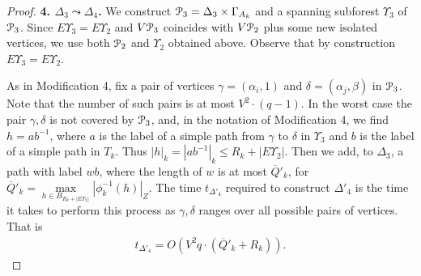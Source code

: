 \documentclass[a4paper,12pt]{article}
\renewcommand{\a}{\alpha }
\renewcommand{\b}{\beta }
\newcommand{\G}{\Gamma }
\newcommand{\g}{\gamma }
\newcommand{\D}{\Delta }
\renewcommand{\d}{\delta }
\newcommand{\U}{\Upsilon }
\newcommand{\cP}{{\cal{P}}}
\numberwithin{equation}{section}
\numberwithin{figure}{section}
\begin{document}
\begin{proof}
{\bf 4. $\D_3 \leadsto \D_4$.}
We construct $\cP_3=\D_3\times
\G_{A_k}$ and a
spanning subforest $\U_3$ of $\cP_3$. Since $E\U_3 =
E\U_2$ and $V\cP_3$ coincides with $V\cP_2$ plus some new isolated
vertices, we use both $\cP_2$ and $\U_2$ obtained above. Observe that by construction $E\U_3 =
E\U_2$.

As in Modification 4, fix a pair of vertices $\g=(\a_i,1)$ and
$\d=(\a_j,\b)$ in $\cP_3$. Note that the number of such pairs is
at most $V^2 \cdot (q-1)$. In the worst case the pair $\g, \d$ is
not covered by $\cP_3$, and, in the notation of Modification 4, we
find $h=ab^{-1}$, where $a$ is the label of a simple path from
$\g$ to $\d$ in $\U_3$ and $b$ is the label of a simple path in
$T_k$. Thus $|h|_k = |ab^{-1}|_k \le R_k+ | E\U_2|$.  Then we add,
to $\D_3$, a path with label $wb$, where the length of $w$ is
 at most $\overline{Q}'_k$, for
$\overline{Q}'_k=\max\limits_{h \in B_{R_k+|
E\U_2|}}|\phi^{-1}_k(h)|_Z$.
The time $t_{\D'_4}$ required to construct $\D'_4$ is the time
it takes to perform this process as $\g,\d$ ranges over all
possible pairs of vertices. That is
\begin{equation}\label{theta'4}
\begin{split}
t_{\D'_4} =
 O(V^2 q \cdot(\overline{Q}'_k+R_k)).
\end{split}
\end{equation}


\end{proof}
\end{document}
